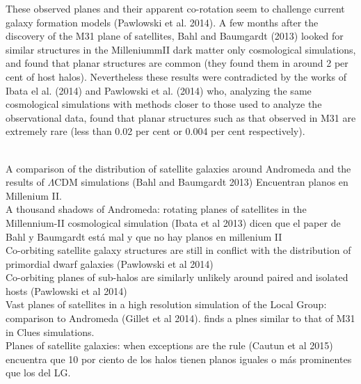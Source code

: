 \documentclass{emulateapj}
\begin{document}
These observed planes and their apparent co-rotation seem to challenge current galaxy formation models (Pawlowski et al. 2014). 
A few months after the discovery of the M31 plane of satellites, Bahl and Baumgardt (2013) looked for similar structures in the MilleniummII dark matter only cosmological simulations, and found that planar structures are common (they found them in around 2 per cent of host halos). 
Nevertheless these results were contradicted by the works of Ibata el al. (2014) and Pawlowski et al. (2014) who, analyzing the same cosmological simulations with methods closer to those used to analyze the observational data, found that planar structures such as that observed in M31 are extremely rare (less than 0.02 per cent or 0.004 per cent respectively).\\


\

\noindent A comparison of the distribution of satellite galaxies
around Andromeda and the results of $\Lambda$CDM simulations (Bahl and
Baumgardt 2013) Encuentran planos en Millenium II.\\
A thousand shadows of Andromeda: rotating planes of satellites in the
Millennium-II cosmological simulation (Ibata et al 2013) dicen que el
paper de Bahl y Baumgardt est\'a mal y que no hay planos en millenium
II\\
Co-orbiting satellite galaxy structures are still in conflict with the
distribution of primordial dwarf galaxies (Pawlowski et al 2014)\\
Co-orbiting planes of sub-halos are similarly unlikely around paired
and isolated hosts (Pawlowski et al 2014)\\
Vast planes of satellites in a high resolution simulation of the Local
Group: comparison to Andromeda (Gillet et al 2014). finds a plnes
similar to that of M31 in Clues simulations.\\
Planes of satellite galaxies: when exceptions are the rule (Cautun et
al 2015) encuentra que 10 por ciento de los halos tienen planos
iguales o m\'as prominentes que los del LG.\\
\end{document}
